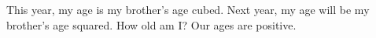 This year, my age is my brother's age cubed. Next year, my age will be my brother's age squared. How old am I? Our ages are positive.
